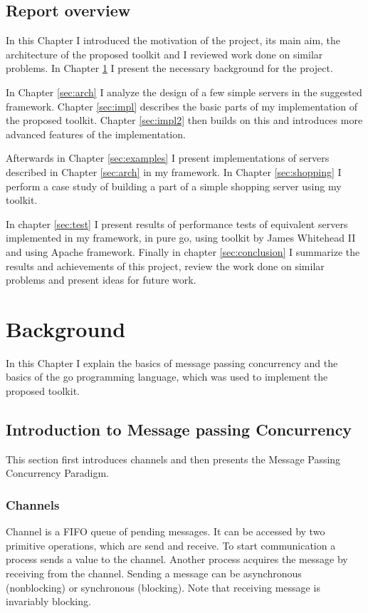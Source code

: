 \documentclass[12pt,a4paper]{article}
\begin{document}
\subsection{Report overview}
In this Chapter I introduced the motivation of the project, its main
aim, the architecture of the proposed toolkit and I reviewed work done
on similar problems. In Chapter \ref{sec:background} 
I present the necessary background for the project.

In Chapter \ref{sec:arch} I analyze the design of a few simple servers
in the suggested framework. Chapter \ref{sec:impl} describes the basic parts of 
my implementation of the proposed toolkit. Chapter \ref{sec:impl2} then builds
on this and introduces more advanced features of the implementation.

Afterwards in Chapter \ref{sec:examples} I present
implementations of servers described in Chapter \ref{sec:arch} in my framework.
In Chapter \ref{sec:shopping} I perform a case study of building
a part of a simple shopping server using my toolkit.

In chapter \ref{sec:test} I present results of performance tests of equivalent 
servers implemented in my framework, in pure go, using toolkit by James Whitehead II
\cite{whitehead} and using Apache framework. Finally in chapter 
\ref{sec:conclusion} I summarize the results and achievements of this 
project, review the work done on similar problems and present ideas for future work.

\newpage
\section{Background}
\label{sec:background}
In this Chapter I explain the basics of message passing concurrency and 
the basics of the go programming language, which was used to implement 
the proposed toolkit.

\subsection{Introduction to Message passing Concurrency}
This section first introduces channels and then presents the Message
Passing Concurrency Paradigm.

\subsubsection{Channels}
Channel is a FIFO queue of pending messages. It can be accessed by two
primitive operations, which are send and receive. To start communication
a process sends a value to the channel. Another process acquires the message
by receiving from the channel. Sending a message can be asynchronous (nonblocking)
or synchronous (blocking). Note that receiving message is invariably blocking.
\cite[293]{book:foundations}
\end{document}
